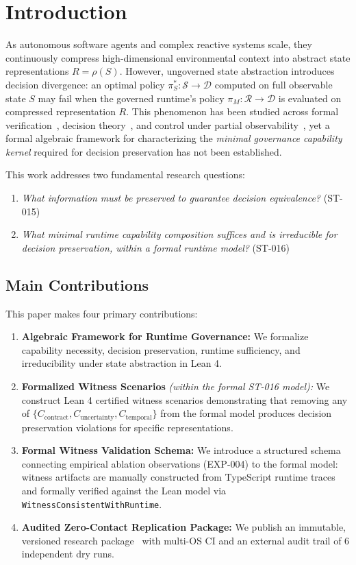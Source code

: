\section{Introduction}

As autonomous software agents and complex reactive systems scale, they continuously
compress high-dimensional environmental context into abstract state representations
$R = \rho(S)$. However, ungoverned state abstraction introduces decision divergence:
an optimal policy $\pi^*_S : \mathcal{S} \to \mathcal{D}$ computed on full observable
state $S$ may fail when the governed runtime's policy $\pi_M : \mathcal{R} \to \mathcal{D}$
is evaluated on compressed representation $R$.
This phenomenon has been studied across formal verification~\cite{cousot1977abstract,leucker2009brief},
decision theory~\cite{blackwell1951comparison}, and control under partial
observability~\cite{kaelbling1998planning}, yet a formal algebraic framework for
characterizing the \emph{minimal governance capability kernel} required for
decision preservation has not been established.

This work addresses two fundamental research questions:
\begin{enumerate}
    \item \textit{What information must be preserved to guarantee decision equivalence?} (ST-015)
    \item \textit{What minimal runtime capability composition suffices and is irreducible for decision preservation, within a formal runtime model?} (ST-016)
\end{enumerate}

\subsection{Main Contributions}
This paper makes four primary contributions:
\begin{enumerate}
    \item \textbf{Algebraic Framework for Runtime Governance:} We formalize capability
    necessity, decision preservation, runtime sufficiency, and irreducibility under
    state abstraction in Lean 4.
    \item \textbf{Formalized Witness Scenarios} \emph{(within the formal ST-016 model):}
    We construct Lean 4 certified witness scenarios demonstrating that removing any of
    $\{C_{\text{contract}}, C_{\text{uncertainty}}, C_{\text{temporal}}\}$ from the
    formal model produces decision preservation violations for specific representations.
    \item \textbf{Formal Witness Validation Schema:} We introduce a structured schema
    connecting empirical ablation observations (EXP-004) to the formal model:
    witness artifacts are manually constructed from TypeScript runtime traces and
    formally verified against the Lean model via \texttt{WitnessConsistentWithRuntime}.
    \item \textbf{Audited Zero-Contact Replication Package:} We publish an
    immutable, versioned research package~\cite{takt_st016_2026} with multi-OS
    CI and an external audit trail of 6 independent dry runs.
\end{enumerate}

